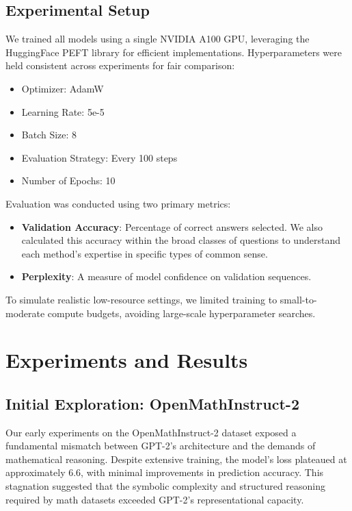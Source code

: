 \documentclass[11pt,twocolumn]{article}
\begin{document}
\subsection{Experimental Setup}
We trained all models using a single NVIDIA A100 GPU, leveraging the HuggingFace PEFT library for efficient implementations. Hyperparameters were held consistent across experiments for fair comparison:
\begin{itemize}
    \setlength\itemsep{0em}
    \setlength\parskip{0em}
    \setlength\parsep{0em}
    
    \item Optimizer: AdamW
    \item Learning Rate: 5e-5
    \item Batch Size: 8
    \item Evaluation Strategy: Every 100 steps
    \item Number of Epochs: 10
\end{itemize}

Evaluation was conducted using two primary metrics:
\begin{itemize}
    \item \textbf{Validation Accuracy}: Percentage of correct answers selected. We also calculated this accuracy within the broad classes of questions to understand each method's expertise in specific types of common sense.
    \item \textbf{Perplexity}: A measure of model confidence on validation sequences.
\end{itemize}

To simulate realistic low-resource settings, we limited training to small-to-moderate compute budgets, avoiding large-scale hyperparameter searches.


\section{Experiments and Results}
\label{sec:experiments}

\subsection{Initial Exploration: OpenMathInstruct-2}
Our early experiments on the OpenMathInstruct-2 dataset exposed a fundamental mismatch between GPT-2’s architecture and the demands of mathematical reasoning. Despite extensive training, the model's loss plateaued at approximately 6.6, with minimal improvements in prediction accuracy. This stagnation suggested that the symbolic complexity and structured reasoning required by math datasets exceeded GPT-2’s representational capacity.
\end{document}
